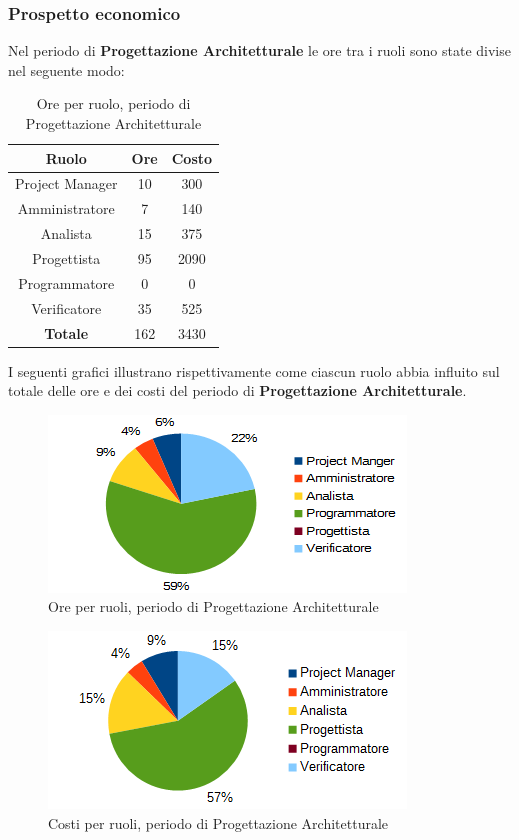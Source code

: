		\subsubsection{Prospetto economico}
		Nel periodo di \textbf{Progettazione Architetturale} le ore tra i ruoli sono state divise nel seguente modo: \\
	\begin{table}[H]
		\centering
		\begin{tabular}{|c|c|c|}
			\hline
			\textbf{Ruolo}		& \textbf{Ore}	& \textbf{Costo} \\
			\hline
			Project Manager		& 10			& 300	\\
			Amministratore		& 7				& 140	\\
			Analista			& 15			& 375	\\
			Progettista			& 95			& 2090	\\
			Programmatore		& 0				& 0	\\
			Verificatore		& 35			& 525	\\
			\hline
			\textbf{Totale}		& 162			& 3430	\\
			\hline
		\end{tabular}
		\caption{Ore per ruolo, periodo di Progettazione Architetturale}
		\end{table}
	I seguenti grafici illustrano rispettivamente come ciascun ruolo abbia influito sul totale
delle ore e dei costi del periodo di \textbf{Progettazione Architetturale}. \\
	\begin{figure}[H]
		\centering
		\includegraphics[scale=1]{immagini/grafici/progettazione_architetturale-torta.png}
		\caption{Ore per ruoli, periodo di Progettazione Architetturale}
	\end{figure}
	\begin{figure}[H]
		\centering
		\includegraphics[scale=1]{immagini/grafici/progettazione_architetturale-torta-costo.png}
		\caption{Costi per ruoli, periodo di Progettazione Architetturale}
	\end{figure}
